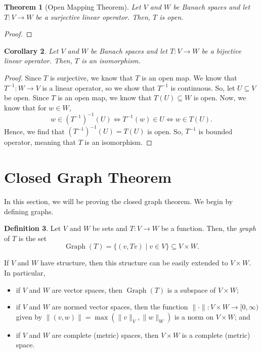 \documentclass[a4paper, openany]{memoir}
\theoremstyle{definition}
\newtheorem{definition}{Definition}[section]
\theoremstyle{plain}
\newtheorem{theorem}[definition]{Theorem}
\newtheorem{corollary}[definition]{Corollary}
\begin{document}
    \begin{theorem}[Open Mapping Theorem]
        Let $V$ and $W$ be Banach spaces and let $T \colon V \to W$ be a surjective linear operator. Then, $T$ is open.
    \end{theorem}
    \begin{proof}
        
    \end{proof}

    \begin{corollary}
        Let $V$ and $W$ be Banach spaces and let $T \colon V \to W$ be a bijective linear operator. Then, $T$ is an isomorphism.
    \end{corollary}
    \begin{proof}
        Since $T$ is surjective, we know that $T$ is an open map. We know that $T^{-1} \colon W \to V$ is a linear operator, so we show that $T^{-1}$ is continuous. So, let $U \subseteq V$ be open. Since $T$ is an open map, we know that $T(U) \subseteq W$ is open. Now, we know that for $w \in W$,
        \[w \in (T^{-1})^{-1}(U) \iff T^{-1}(w) \in U \iff w \in T(U).\]
        Hence, we find that $(T^{-1})^{-1}(U) = T(U)$ is open. So, $T^{-1}$ is bounded operator, meaning that $T$ is an isomorphism.
    \end{proof}
    \newpage

    \section{Closed Graph Theorem}
    In this section, we will be proving the closed graph theorem. We begin by defining graphs.
    \begin{definition}
        Let $V$ and $W$ be sets and $T \colon V \to W$ be a function. Then, the \emph{graph} of $T$ is the set
        \[\operatorname{Graph}(T) = \{(v, Tv) \mid v \in V\} \subseteq V \times W.\]
    \end{definition}
    \noindent If $V$ and $W$ have structure, then this structure can be easily extended to $V \times W$. In particular, 
    \begin{itemize}
        \item if $V$ and $W$ are vector spaces, then $\operatorname{Graph}(T)$ is a subspace of $V \times W$;
        \item if $V$ and $W$ are normed vector spaces, then the function $\lVert \cdot \rVert \colon V \times W \to [0, \infty)$ given by $\lVert (v, w) \rVert = \max(\lVert v \rVert_V, \lVert w \rVert_W)$ is a norm on $V \times W$; and 
        \item if $V$ and $W$ are complete (metric) spaces, then $V \times W$ is a complete (metric) space.
    \end{itemize}
    
\end{document}
